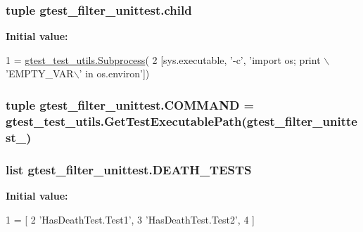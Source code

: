 \subsubsection[{child}]{\setlength{\rightskip}{0pt plus 5cm}tuple gtest\+\_\+filter\+\_\+unittest.\+child}\label{namespacegtest__filter__unittest_a158829096400f19be6d8a3ef8ca8b76a}
{\bfseries Initial value\+:}
\begin{DoxyCode}
1 = \hyperlink{classgtest__test__utils_1_1_subprocess}{gtest\_test\_utils.Subprocess}(
2     [sys.executable, \textcolor{stringliteral}{'-c'}, \textcolor{stringliteral}{'import os; print \(\backslash\)'EMPTY\_VAR\(\backslash\)' in os.environ'}])
\end{DoxyCode}
\hypertarget{namespacegtest__filter__unittest_a37a3f33245e16e9733ae3568e623b837}{}
\subsubsection[{C\+O\+M\+M\+A\+N\+D}]{\setlength{\rightskip}{0pt plus 5cm}tuple gtest\+\_\+filter\+\_\+unittest.\+C\+O\+M\+M\+A\+N\+D = {\bf gtest\+\_\+test\+\_\+utils.\+Get\+Test\+Executable\+Path}(\textquotesingle{}gtest\+\_\+filter\+\_\+unittest\+\_\+\textquotesingle{})}\label{namespacegtest__filter__unittest_a37a3f33245e16e9733ae3568e623b837}
\hypertarget{namespacegtest__filter__unittest_ab14d082dc05c07458595606a64616d0b}{}
\subsubsection[{D\+E\+A\+T\+H\+\_\+\+T\+E\+S\+T\+S}]{\setlength{\rightskip}{0pt plus 5cm}list gtest\+\_\+filter\+\_\+unittest.\+D\+E\+A\+T\+H\+\_\+\+T\+E\+S\+T\+S}\label{namespacegtest__filter__unittest_ab14d082dc05c07458595606a64616d0b}
{\bfseries Initial value\+:}
\begin{DoxyCode}
1 = [
2     \textcolor{stringliteral}{'HasDeathTest.Test1'},
3     \textcolor{stringliteral}{'HasDeathTest.Test2'},
4     ]
\end{DoxyCode}
\hypertarget{namespacegtest__filter__unittest_affe760ab1e8c4c7b61566076c37c1d69}{}
